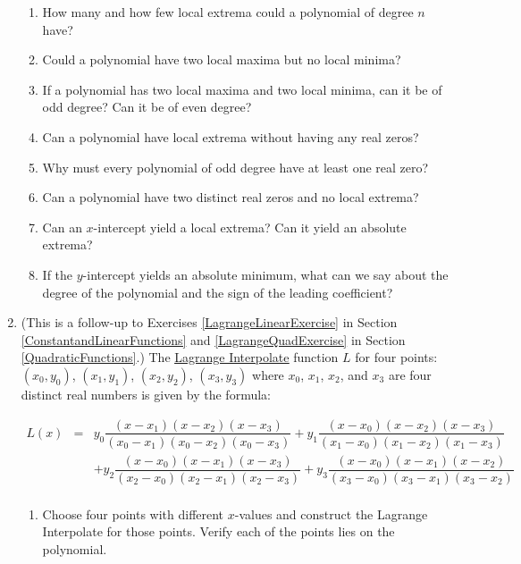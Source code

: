 \documentclass{ximera}
\begin{document}
\begin{enumerate}
\begin{enumerate}
\item How many and how few  local extrema could a polynomial of degree $n$ have?  
\item Could a polynomial have two local maxima but no local minima?  
\item If a polynomial has two local maxima and two local minima, can it be of odd degree?  Can it be of even degree?
\item Can a polynomial have local extrema without having any real zeros?
\item Why must every polynomial of odd degree have at least one real zero?
\item Can a polynomial have two distinct real zeros and no local extrema?
\item Can an $x$-intercept yield a local extrema?  Can it yield an absolute extrema?
\item If the $y$-intercept yields an absolute minimum, what can we say about the degree of the polynomial and the sign of the leading coefficient?   

\end{enumerate}

\item \label{LagrangePolyExercise} (This is a follow-up to Exercises \ref{LagrangeLinearExercise} in Section \ref{ConstantandLinearFunctions} and \ref{LagrangeQuadExercise} in Section \ref{QuadraticFunctions}.) The  \href{https://en.wikipedia.org/wiki/Lagrange_polynomial}{\underline{Lagrange Interpolate}} function $L$  for four  points:  $(x_{0}, y_{0})$, $(x_{1}, y_{1})$,  $(x_{2}, y_{2})$,   $(x_{3}, y_{3})$ where $x_{0}$,  $x_{1}$, $x_{2}$, and $x_{3}$ are four distinct real numbers is given by the formula: 

 \[ \begin{array}{rcl}
 
 L(x) & = &  y_{0}  \dfrac{(x - x_{1}) (x - x_{2}) (x-x_{3})}{(x_{0} - x_{1})(x_{0} - x_{2})(x_{0} - x_{3})}+ y_{1}  \dfrac{(x - x_{0}) (x - x_{2}) (x-x_{3})}{(x_{1} - x_{0})(x_{1} - x_{2})(x_{1} - x_{3})} \\ [15pt]
         &&  +y_{2}  \dfrac{(x - x_{0}) (x - x_{1}) (x-x_{3})}{(x_{2} - x_{0})(x_{2} - x_{1})(x_{2} - x_{3})}+ y_{3}  \dfrac{(x - x_{0}) (x - x_{1}) (x-x_{2})}{(x_{3} - x_{0})(x_{3} - x_{1})(x_{3} - x_{2})} \\ \end{array}\]

\begin{enumerate}

\item Choose four points with different $x$-values and construct the Lagrange Interpolate for those points.  Verify each of the points lies on the polynomial.  


\end{enumerate}
\end{enumerate}
\end{document}
